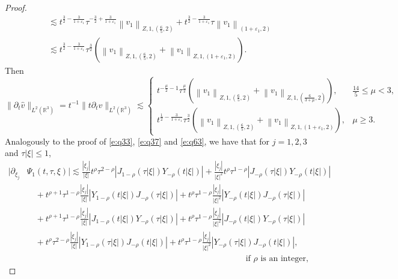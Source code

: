 \documentclass[11pt,twoside]{article}
\newcommand{\R}{\mathbb R}
\newcommand{\p}{\partial}
\newcommand{\f}{\frac}
\theoremstyle{plain}
\theoremstyle{definition}
\theoremstyle{remark}
\numberwithin{equation}{section}
\begin{document}
\begin{proof}
\begin{equation}\label{l15}
\begin{aligned}
& \lesssim t^{\f32-\frac{3}{1+\varepsilon_1}} \tau^{-\f32+\frac{3}{1+\varepsilon_1}}\left\|v_1\right\|_{Z, 1, \left(\f65, 2\right)}+ t^{\f32-\frac{3}{1+\varepsilon_1}} \tau\left\|v_1\right\|_{\left(1+\varepsilon_1, 2\right)}\\
& \lesssim t^{\f32-\frac{3}{1+\varepsilon_1}} \tau^{\f32}(\left\|v_1\right\|_{Z, 1, \left(\f65, 2\right)}+\left\|v_1\right\|_{Z, 1, \left(1+\varepsilon_1, 2\right)}).
\end{aligned}
\end{equation}
Then
\begin{equation}\label{l16}
\|\p_t\hat{v}\|_{L^2(\R^3)}=t^{-1}\|t\p_t\hat{v}\|_{L^2(\R^3)}
 \lesssim\begin{cases}
 t^{-\f{\mu}{2}-1} \tau^{\f{\mu}{2}}(\left\|v_1\right\|_{Z, 1, \left(\f65, 2\right)}+\left\|v_1\right\|_{Z, 1, \left(\f{6}{3+\mu}, 2\right)}),&\f{14}{5}\leq\mu<3,\\
 t^{\f12-\frac{3}{1+\varepsilon_1}} \tau^{\f32}(\left\|v_1\right\|_{Z, 1, \left(\f65, 2\right)}+\left\|v_1\right\|_{Z, 1, \left(1+\varepsilon_1, 2\right)}),&\mu\geq3.
 \end{cases}
\end{equation}
Analogously to the proof of \eqref{e:q33}, \eqref{e:q37} and \eqref{e:q63}, we have that
for $j=1,2,3$ and $\tau|\xi|\leq 1$,
\begin{equation}\label{l17}
\begin{aligned}
|\partial_{\xi_j}& \Psi_1(t, \tau, \xi)|
 \lesssim  \frac{|\xi_j|}{|\xi|} t^\rho\tau^{2-\rho} \left| J_{1-\rho}(\tau|\xi|) Y_{-\rho}(t|\xi|) \right|
+ \frac{|\xi_j|}{|\xi|^2} t^\rho\tau^{1-\rho} \left| J_{-\rho}(\tau|\xi|) Y_{-\rho}(t|\xi|) \right| \\
& \quad + t^{\rho+1}\tau^{1-\rho}\f{|\xi_j|}{|\xi|} \left| Y_{1-\rho}(t|\xi|)J_{-\rho}(\tau|\xi|) \right|
+ t^\rho\tau^{1-\rho} \frac{|\xi_j|}{|\xi|^2} \left| Y_{-\rho}(t|\xi|)J_{-\rho}(\tau|\xi|) \right|\\
& \quad + t^{\rho+1}\tau^{1-\rho}\f{|\xi_j|}{|\xi|} \left| J_{1-\rho}(t|\xi|) Y_{-\rho}(\tau|\xi|) \right|
+ t^\rho\tau^{1-\rho} \frac{|\xi_j|}{|\xi|^2} \left| J_{-\rho}(t|\xi|) Y_{-\rho}(\tau|\xi|) \right| \\
& \quad + t^\rho\tau^{2-\rho} \f{|\xi_j|}{|\xi|} \left| Y_{1-\rho}(\tau|\xi|) J_{-\rho}(t|\xi|) \right|
+ t^\rho\tau^{1-\rho} \frac{|\xi_j|}{|\xi|^2} \left| Y_{-\rho}(\tau|\xi|) J_{-\rho}(t|\xi|) \right|, \\&\qquad\qquad\qquad\qquad\qquad\qquad\qquad\qquad\qquad\qquad\qquad\qquad\qquad\text{if $\rho$ is an integer},

\end{aligned}
\end{equation}
\end{proof}
\end{document}
